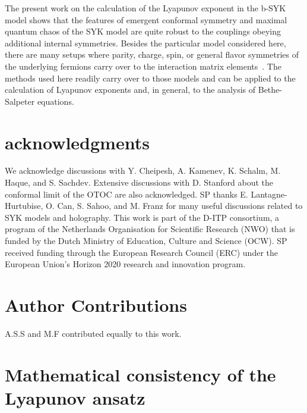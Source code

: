 The present work on the calculation of the Lyapunov exponent in the b-SYK model shows that the features of emergent conformal symmetry and maximal quantum chaos of the SYK model are quite robust to the couplings obeying additional internal symmetries.
Besides the particular model considered here, there are many setups where parity, charge, spin,
or general flavor symmetries of the underlying fermions carry over to the interaction matrix elements~\cite{Chowdhury-RMP2022,Franz2018-review,Kim2019,sahoo_traversable_2020,xu_sparse_2020}.
The methods used here readily carry over to those models and can be applied to the calculation of Lyapunov exponents and, in general, to the analysis of Bethe-Salpeter equations.


\section*{acknowledgments}
	We acknowledge discussions with Y. Cheipesh, A. Kamenev, K. Schalm, M. Haque, and S. Sachdev. Extensive discussions with D. Stanford about the conformal limit of the OTOC are also acknowledged.
	SP thanks E. Lantagne-Hurtubise, O. Can, S. Sahoo, and M. Franz for many useful discussions related to SYK models and holography.  This work is part of the D-ITP consortium,
	a program of the Netherlands Organisation for Scientific Research (NWO) that is funded by the Dutch Ministry of Education, Culture and Science (OCW).
	SP received funding through the European Research Council (ERC) under the European Union's Horizon 2020 research and innovation program.


\section*{Author Contributions}
A.S.S and M.F contributed equally to this work.

\appendix



\section{Mathematical consistency of the Lyapunov ansatz}
\label{sec:technical_explanation}

